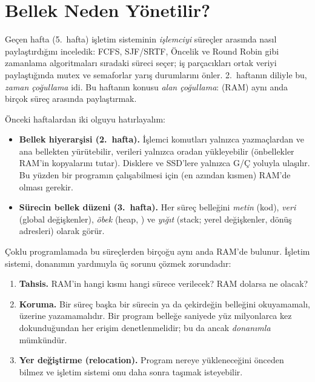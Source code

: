 \setcounter{tocdepth}{1}
\tableofcontents

\section{Bellek Neden Yönetilir?}

Geçen hafta (5.~hafta) işletim sisteminin \emph{işlemciyi} süreçler arasında nasıl paylaştırdığını inceledik: FCFS, SJF/SRTF, Öncelik ve Round Robin gibi zamanlama algoritmaları sıradaki süreci seçer; iş parçacıkları ortak veriyi paylaştığında mutex ve semaforlar yarış durumlarını önler. 2.~haftanın diliyle bu, \emph{zaman çoğullama} idi. Bu haftanın konusu \emph{alan çoğullama}:  (RAM) aynı anda birçok süreç arasında paylaştırmak.

Önceki haftalardan iki olguyu hatırlayalım:
\begin{itemize}
  \item \textbf{Bellek hiyerarşisi (2.~hafta).} İşlemci komutları yalnızca yazmaçlardan ve ana bellekten yürütebilir, verileri yalnızca oradan yükleyebilir (önbellekler RAM'in kopyalarını tutar). Disklere ve SSD'lere yalnızca G/Ç yoluyla ulaşılır. Bu yüzden bir programın çalışabilmesi için (en azından kısmen) RAM'de olması gerekir.
  \item \textbf{Sürecin bellek düzeni (3.~hafta).} Her süreç belleğini \emph{metin} (kod), \emph{veri} (global değişkenler), \emph{öbek} (heap, ) ve \emph{yığıt} (stack; yerel değişkenler, dönüş adresleri) olarak görür.
\end{itemize}

Çoklu programlamada bu süreçlerden birçoğu aynı anda RAM'de bulunur. İşletim sistemi, donanımın yardımıyla üç sorunu çözmek zorundadır:
\begin{enumerate}[leftmargin=1.4em]
  \item \textbf{Tahsis.} RAM'in hangi kısmı hangi sürece verilecek? RAM dolarsa ne olacak?
  \item \textbf{Koruma.} Bir süreç başka bir sürecin ya da çekirdeğin belleğini okuyamamalı, üzerine yazamamalıdır. Bir program belleğe saniyede yüz milyonlarca kez dokunduğundan her erişim denetlenmelidir; bu da ancak \emph{donanımla} mümkündür.
  \item \textbf{Yer değiştirme (relocation).} Program nereye yükleneceğini önceden bilmez ve işletim sistemi onu daha sonra taşımak isteyebilir.
\end{enumerate}

